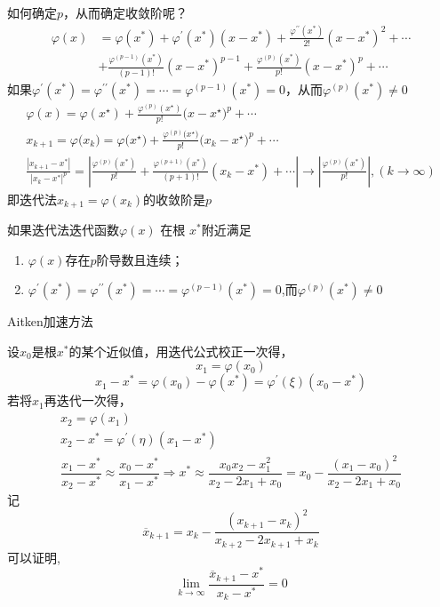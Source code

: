 \begin{note}
    如何确定$p$，从而确定收敛阶呢？
    \[
        \begin{aligned}
            \varphi(x)&=\varphi(x^{*})+\varphi^{\prime}(x^{*})(x-x^{*})+\frac{\varphi^{\prime\prime}(x^{*})}{2!}(x-x^{*})^{2}+\cdots\\
            &+\frac{\varphi^{(p-1)}(x^{*})}{(p-1)!}(x-x^{*})^{p-1}+\frac{\varphi^{(p)}(x^{*})}{p!}(x-x^{*})^{p}+\cdots
        \end{aligned}
    \]
    如果$\varphi^{\prime}(x^{*})=\varphi^{\prime\prime}(x^{*})=\cdots=\varphi^{(p-1)}(x^{*})=0$，从而$\varphi^{(p)}(x^{*})\neq 0$
    \[
        \begin{gathered}
            \varphi(x)=\varphi(x^{\star})+\frac{\varphi^{(p)}(x^{\star})}{p!}\big(x-x^{\star}\big)^{p}+\cdots  \\
            x_{k+1}=\varphi\big(x_{k}\big)=\varphi\big(x^{\star}\big)+\frac{\varphi^{(p)}\big(x^{\star}\big)}{p!}\big(x_{k}-x^{\star}\big)^{p}+\cdots  \\
            {\frac{\left|x_{k+1}-x^{*}\right|}{\left|x_{k}-x^{*}\right|^{p}}}=\left|{\frac{\varphi^{(p)}(x^{*})}{p!}}+{\frac{\varphi^{(p+1)}(x^{*})}{(p+1)!}}(x_{k}-x^{*})+\cdots\right|\to\left|{\frac{\varphi^{(p)}(x^{*})}{p!}}\right|,(k\to\infty) 
        \end{gathered}
    \]
    即迭代法$x_{k+1}=\varphi(x_{k})$的收敛阶是$p$
\end{note}
\begin{theorem}
    如果迭代法迭代函数$\varphi(x)$ 在根 $x^*$附近满足
    \begin{enumerate}
        \item $\varphi(x)$存在$p$阶导数且连续；
        \item $\varphi^{\prime}(x^{*})=\varphi^{\prime\prime}(x^{*})=\cdots=\varphi^{(p-1)}(x^{*})=0$,而$\varphi^{(p)}(x^{*})\neq 0$
    \end{enumerate}
\end{theorem}
\begin{note}
    Aitken加速方法

设$x_0$是根$x^*$的某个近似值，用迭代公式校正一次得，
\[
    x_1=\varphi(x_0)   
\]
\[
    x_1-x^*=\varphi(x_0)-\varphi(x^*)=\varphi^{\prime}(\xi)(x_0-x^*)
\]
若将$x_1$再迭代一次得，
\[
    \begin{array}{c}
        x_2=\varphi(x_1)\\
        x_2-x^*=\varphi^{\prime}(\eta)(x_1-x^*)\\
        \dfrac{x_1-x^*}{x_2-x^*}\approx\dfrac{x_0-x^*}{x_1-x^*}\Rightarrow x^*\approx\dfrac{x_0x_2-x_1^2}{x_2-2x_1+x_0}=x_0-\dfrac{(x_1-x_0)^2}{x_2-2x_1+x_0}
    \end{array}
\]
记
\[
    \overline{x}_{k+1}=x_{k}-\frac{(x_{k+1}-x_{k})^{2}}{x_{k+2}-2x_{k+1}+x_{k}}
\]
可以证明,
\[
    \lim_{k\to\infty}\frac{\overline{x}_{k+1}-x^{*}}{x_{k}-x^{*}}=0
\]
\end{note}
